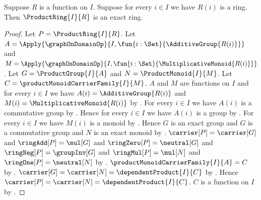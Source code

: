 \begin{theorem}\label{product_ring_is_exact}
    Suppose $R$ is a function on $I$.
    Suppose for every $i\in I$ we have $R(i)$ is a ring.
    Then $\ProductRing{I}{R}$ is an exact ring.
\end{theorem}
\begin{proof}
    Let $P=\ProductRing{I}{R}$.
    Let
        $A=\Apply{\graphOnDomainOp}{
            I,\fun{i:\Set}{\AdditiveGroup{R(i)}}}$ and
        $M=\Apply{\graphOnDomainOp}{
            I,\fun{i:\Set}{\MultiplicativeMonoid{R(i)}}}$.
    Let $G=\ProductGroup{I}{A}$ and $N=\ProductMonoid{I}{M}$.
    Let $C=\productMonoidCarrierFamily{I}{M}$.
    $A$ and $M$ are functions on $I$ and for every $i\in I$ we have
        $A(i)=\AdditiveGroup{R(i)}$ and
        $M(i)=\MultiplicativeMonoid{R(i)}$ by
        .
    For every $i\in I$ we have $A(i)$ is a commutative group by
        .
    Hence for every $i\in I$ we have $A(i)$ is a group by
        .
    For every $i\in I$ we have $M(i)$ is a monoid by
        .
    Hence $G$ is an exact group and $G$ is a commutative group and
        $N$ is an exact monoid by
        .
    $\carrier[P]=\carrier[G]$ and
        $\ringAdd[P]=\mul[G]$ and
        $\ringZero[P]=\neutral[G]$ and
        $\ringNeg[P]=\groupInv[G]$ and
        $\ringMul[P]=\mul[N]$ and
        $\ringOne[P]=\neutral[N]$ by
        .
    $\productMonoidCarrierFamily{I}{A}=C$ by
        .
    $\carrier[G]=\carrier[N]=\dependentProduct{I}{C}$ by
        .
    Hence $\carrier[P]=\carrier[N]=\dependentProduct{I}{C}$.
    $C$ is a function on $I$ by
        .


\end{proof}
